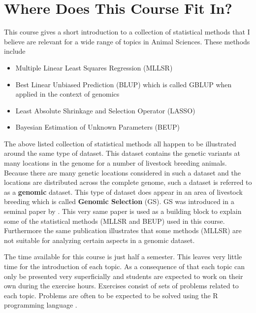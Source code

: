 \documentclass[
]{book}
\providecommand{\tightlist}{%
  \setlength{\itemsep}{0pt}\setlength{\parskip}{0pt}}
\theoremstyle{definition}
\theoremstyle{definition}
\theoremstyle{definition}
\theoremstyle{remark}
\begin{document}
\hypertarget{where-does-this-course-fit-in}{%
\section*{Where Does This Course Fit In?}\label{where-does-this-course-fit-in}}

This course gives a short introduction to a collection of statistical methods that I believe are relevant for a wide range of topics in Animal Sciences. These methods include

\begin{itemize}
\tightlist
\item
  Multiple Linear Least Squares Regression (MLLSR)
\item
  Best Linear Unbiased Prediction (BLUP) which is called GBLUP when applied in the context of genomics
\item
  Least Absolute Shrinkage and Selection Operator (LASSO)
\item
  Bayesian Estimation of Unknown Parameters (BEUP)
\end{itemize}

The above listed collection of statistical methods all happen to be illustrated around the same type of dataset. This dataset contains the genetic variants at many locations in the genome for a number of livestock breeding animals. Because there are many genetic locations considered in such a dataset and the locations are distributed across the complete genome, such a dataset is referred to as a \textbf{genomic} dataset. This type of dataset does appear in an area of livestock breeding which is called \textbf{Genomic Selection} (GS). GS was introduced in a seminal paper by \citep{Meuwissen2001}. This very same paper is used as a building block to explain some of the statistical methods (MLLSR and BEUP) used in this course. Furthermore the same publication illustrates that some methods (MLLSR) are not suitable for analyzing certain aspects in a genomic dataset.

The time available for this course is just half a semester. This leaves very little time for the introduction of each topic. As a consequence of that each topic can only be presented very superficially and students are expected to work on their own during the exercise hours. Exercises consist of sets of problems related to each topic. Problems are often to be expected to be solved using the R programming language \citep{RCoreTeam2018}.
\end{document}
